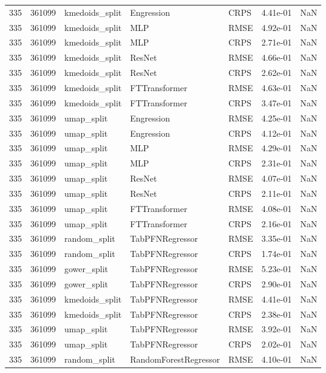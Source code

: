 \begin{tabular}{rrlllrr}
335 & 361099 & kmedoids\_split & Engression & CRPS & 4.41e-01 & NaN \\
335 & 361099 & kmedoids\_split & MLP & RMSE & 4.92e-01 & NaN \\
335 & 361099 & kmedoids\_split & MLP & CRPS & 2.71e-01 & NaN \\
335 & 361099 & kmedoids\_split & ResNet & RMSE & 4.66e-01 & NaN \\
335 & 361099 & kmedoids\_split & ResNet & CRPS & 2.62e-01 & NaN \\
335 & 361099 & kmedoids\_split & FTTransformer & RMSE & 4.63e-01 & NaN \\
335 & 361099 & kmedoids\_split & FTTransformer & CRPS & 3.47e-01 & NaN \\
335 & 361099 & umap\_split & Engression & RMSE & 4.25e-01 & NaN \\
335 & 361099 & umap\_split & Engression & CRPS & 4.12e-01 & NaN \\
335 & 361099 & umap\_split & MLP & RMSE & 4.29e-01 & NaN \\
335 & 361099 & umap\_split & MLP & CRPS & 2.31e-01 & NaN \\
335 & 361099 & umap\_split & ResNet & RMSE & 4.07e-01 & NaN \\
335 & 361099 & umap\_split & ResNet & CRPS & 2.11e-01 & NaN \\
335 & 361099 & umap\_split & FTTransformer & RMSE & 4.08e-01 & NaN \\
335 & 361099 & umap\_split & FTTransformer & CRPS & 2.16e-01 & NaN \\
335 & 361099 & random\_split & TabPFNRegressor & RMSE & 3.35e-01 & NaN \\
335 & 361099 & random\_split & TabPFNRegressor & CRPS & 1.74e-01 & NaN \\
335 & 361099 & gower\_split & TabPFNRegressor & RMSE & 5.23e-01 & NaN \\
335 & 361099 & gower\_split & TabPFNRegressor & CRPS & 2.90e-01 & NaN \\
335 & 361099 & kmedoids\_split & TabPFNRegressor & RMSE & 4.41e-01 & NaN \\
335 & 361099 & kmedoids\_split & TabPFNRegressor & CRPS & 2.38e-01 & NaN \\
335 & 361099 & umap\_split & TabPFNRegressor & RMSE & 3.92e-01 & NaN \\
335 & 361099 & umap\_split & TabPFNRegressor & CRPS & 2.02e-01 & NaN \\
335 & 361099 & random\_split & RandomForestRegressor & RMSE & 4.10e-01 & NaN \\

\end{tabular}

